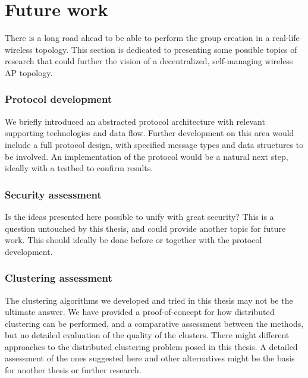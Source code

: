 \section{Future work}
There is a long road ahead to be able to perform the group creation in a real-life wireless topology. This section is dedicated to presenting some possible topics of research
that could further the vision of a decentralized, self-managing wireless AP topology. 

\subsubsection{Protocol development}
We briefly introduced an abstracted protocol architecture with relevant supporting technologies and data flow. Further development on this area would include a full protocol design, with
specified message types and data structures to be involved. An implementation of the protocol would be a natural next step, ideally with a testbed to confirm results. 

\subsubsection{Security assessment}
Is the ideas presented here possible to unify with great security? This is a question untouched by this thesis, and could provide another topic for future work. This should ideally
be done before or together with the protocol development. 

\subsubsection{Clustering assessment}
The clustering algorithms we developed and tried in this thesis may not be the ultimate answer. We have provided a proof-of-concept for how distributed clustering can be performed, and 
a comparative assessment between the methods, but no detailed evaluation of the quality of the clusters. There might different approaches to the distributed clustering problem 
posed in this thesis. A detailed assessment of the ones suggested here and other alternatives might be the basis for another thesis or further research.


